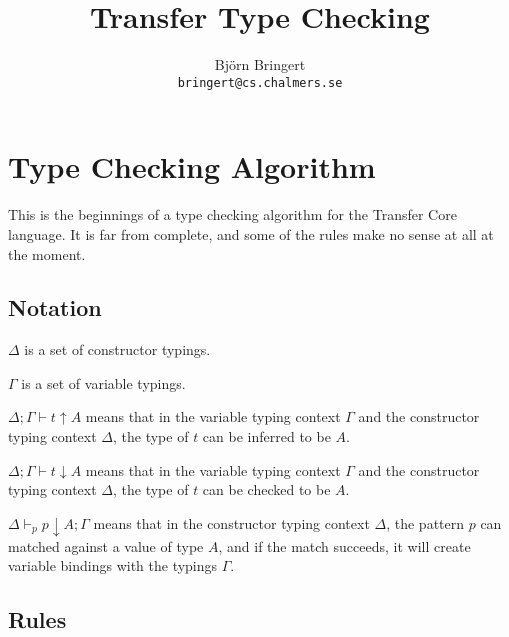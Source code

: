 \documentclass[a4paper,11pt]{article}
\begin{document}
\title{Transfer Type Checking}
\author{Bj\"orn Bringert \\ \texttt{bringert@cs.chalmers.se}}
\maketitle

\section{Type Checking Algorithm}

This is the beginnings of a type checking algorithm for the 
Transfer Core language. It is far from complete,
and some of the rules make no sense at all at the moment.

\subsection{Notation}

$\Delta$ is a set of constructor typings.

$\Gamma$ is a set of variable typings.

$\Delta;\Gamma \vdash t \uparrow A$ means that in the
variable typing context $\Gamma$ and the constructor
typing context $\Delta$, the type of $t$ can be inferred 
to be $A$.

$\Delta;\Gamma \vdash t \downarrow A$ means that in the
variable typing context $\Gamma$ and the constructor
typing context $\Delta$, the type of $t$ can be 
checked to be $A$.

$\Delta \vdash_p p \downarrow A; \Gamma$ means that
in the constructor typing context $\Delta$,
the pattern $p$ can matched against a value of type
$A$, and if the match succeeds, it will create
variable bindings with the typings $\Gamma$.


\subsection{Rules}
\end{document}
